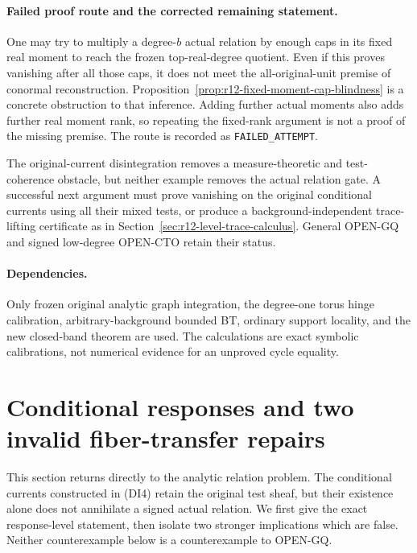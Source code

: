 \documentclass[11pt,a4paper]{article}
\numberwithin{equation}{section}
\theoremstyle{definition}
\theoremstyle{remark}
\begin{document}
\paragraph{Failed proof route and the corrected remaining statement.}
One may try to multiply a degree-$b$ actual relation by enough
caps in its fixed real moment to reach the frozen top-real-degree
quotient. Even if this proves vanishing after all those caps, it
does not meet the all-original-unit premise of conormal
reconstruction. Proposition~\ref{prop:r12-fixed-moment-cap-blindness}
is a concrete obstruction to that inference. Adding further
actual moments also adds further real moment rank, so repeating
the fixed-rank argument is not a proof of the missing premise.
The route is recorded as \texttt{FAILED\_ATTEMPT}.

The original-current disintegration removes a measure-theoretic
and test-coherence obstacle, but neither example removes the
actual relation gate. A successful next argument must prove
vanishing on the original conditional currents using all their
mixed tests, or produce a background-independent trace-lifting
certificate as in Section~\ref{sec:r12-level-trace-calculus}.
General OPEN-GQ and signed low-degree OPEN-CTO retain their status.

\paragraph{Dependencies.}
Only frozen original analytic graph integration, the degree-one
torus hinge calibration, arbitrary-background bounded BT,
ordinary support locality, and the new closed-band theorem are
used. The calculations are exact symbolic calibrations, not
numerical evidence for an unproved cycle equality.



\section{Conditional responses and two invalid fiber-transfer repairs}
\label{sec:r12-conditional-response-gate}

This section returns directly to the analytic relation problem.
The conditional currents constructed in (DI4) retain the original
test sheaf, but their existence alone does not annihilate a signed
actual relation. We first give the exact response-level statement,
then isolate two stronger implications which are false. Neither
counterexample below is a counterexample to OPEN-GQ.
\end{document}
